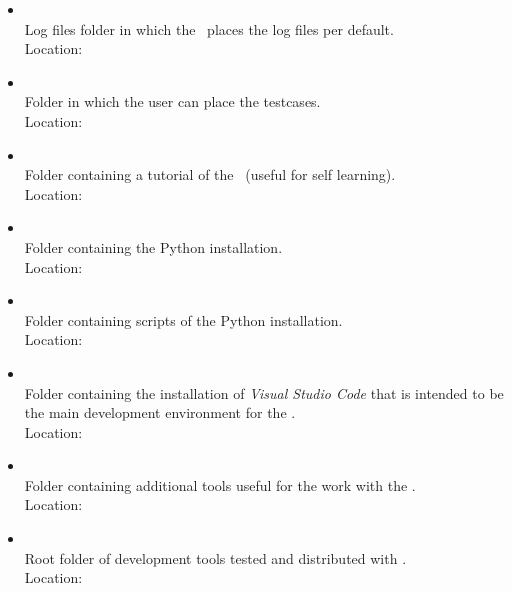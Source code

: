 \begin{itemize}
   \item {}\\
         Log files folder in which the \rfw\ places the log files per default.\\
         Location: 

   \item {}\\
         Folder in which the user can place the testcases.\\
         Location: 

   \item {}\\
         Folder containing a tutorial of the \rfw\ (useful for self learning).\\
         Location: 

   \item {}\\
         Folder containing the Python installation.\\
         Location: 

   \item {}\\
         Folder containing scripts of the Python installation.\\
         Location: 

   \item {}\\
         Folder containing the installation of \textit{Visual Studio Code} that is intended
         to be the main development environment for the \rfw.\\
         Location: 

   \item {}\\
         Folder containing additional tools useful for the work with the \rfw.\\
         Location: 

   \item {}\\
         Root folder of development tools tested and distributed with \rfw.\\
         Location: 


\end{itemize}
